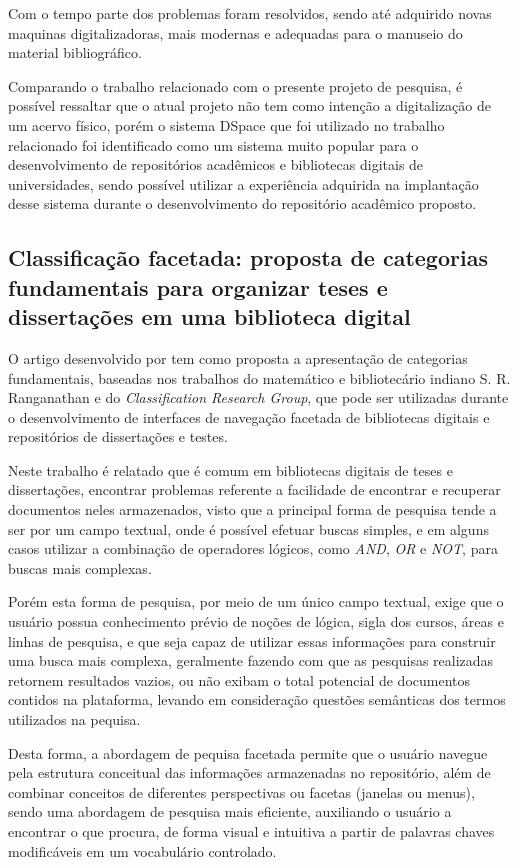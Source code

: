 Com o tempo parte dos problemas foram resolvidos, sendo até adquirido novas
maquinas digitalizadoras, mais modernas e adequadas para o manuseio do material
bibliográfico.

Comparando o trabalho relacionado com o presente projeto de pesquisa,
é possível ressaltar que o atual projeto não tem como intenção a digitalização
de um acervo físico, porém o sistema DSpace que foi utilizado no trabalho
relacionado foi identificado como um sistema muito popular para o desenvolvimento
de repositórios acadêmicos e bibliotecas digitais de universidades, sendo
possível utilizar a experiência adquirida na implantação desse sistema durante
o desenvolvimento do repositório acadêmico proposto.

\subsection{Classificação facetada: proposta de categorias fundamentais para organizar teses e dissertações em uma biblioteca digital}

O artigo desenvolvido por \cite{2021:Pereira} tem como
proposta a apresentação de categorias fundamentais, baseadas nos trabalhos
do matemático e bibliotecário indiano S. R. Ranganathan e do \emph{Classification Research Group}, que pode ser utilizadas
durante o desenvolvimento de interfaces de navegação facetada de bibliotecas
digitais e repositórios de dissertações e testes.

Neste trabalho é relatado que é comum em bibliotecas digitais de teses
e dissertações, encontrar problemas referente a facilidade de encontrar
e recuperar documentos neles armazenados, visto que a principal forma de
pesquisa tende a ser por um campo textual, onde é possível efetuar buscas
simples, e em alguns casos utilizar a combinação de operadores lógicos, como
\emph{AND}, \emph{OR} e \emph{NOT}, para buscas mais complexas.

Porém esta forma de pesquisa, por meio de um único campo textual,
exige que o usuário possua conhecimento prévio de noções de lógica,
sigla dos cursos, áreas e linhas de pesquisa, e que seja capaz de
utilizar essas informações para construir uma busca mais complexa,
geralmente fazendo com que as pesquisas realizadas retornem resultados
vazios, ou não exibam o total potencial de documentos contidos na plataforma,
levando em consideração questões semânticas dos termos utilizados na pequisa.

Desta forma, a abordagem de pequisa facetada permite que o usuário navegue
pela estrutura conceitual das informações armazenadas no repositório, além de
combinar conceitos de diferentes perspectivas ou facetas (janelas ou menus), sendo uma abordagem
de pesquisa mais eficiente, auxiliando o usuário a encontrar o que procura,
de forma visual e intuitiva a partir de palavras chaves modificáveis em um
vocabulário controlado.

